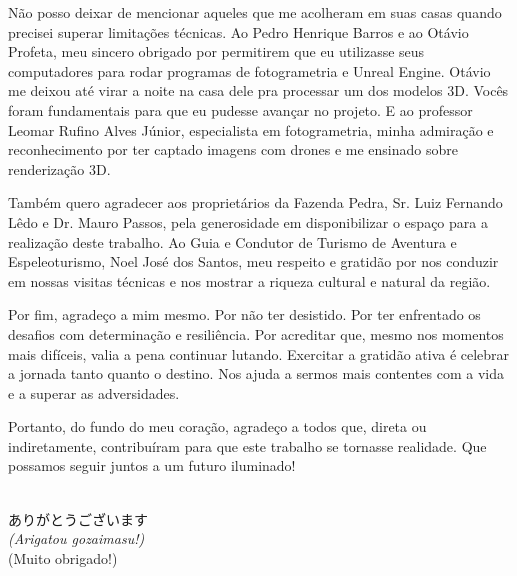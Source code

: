 Não posso deixar de mencionar aqueles que me acolheram em suas casas quando precisei superar limitações técnicas. Ao Pedro Henrique Barros e ao Otávio Profeta, meu sincero obrigado por permitirem que eu utilizasse seus computadores para rodar programas de fotogrametria e Unreal Engine. Otávio me deixou até virar a noite na casa dele pra processar um dos modelos 3D. Vocês foram fundamentais para que eu pudesse avançar no projeto. E ao professor Leomar Rufino Alves Júnior, especialista em fotogrametria, minha admiração e reconhecimento por ter captado imagens com drones e me ensinado sobre renderização 3D.

Também quero agradecer aos proprietários da Fazenda Pedra, Sr. Luiz Fernando Lêdo e Dr. Mauro Passos, pela generosidade em disponibilizar o espaço para a realização deste trabalho.  Ao Guia e Condutor de Turismo de Aventura e Espeleoturismo, Noel José dos Santos, meu respeito e gratidão por nos conduzir em nossas visitas técnicas e nos mostrar a riqueza cultural e natural da região.

Por fim, agradeço a mim mesmo. Por não ter desistido. Por ter enfrentado os desafios com determinação e resiliência. Por acreditar que, mesmo nos momentos mais difíceis, valia a pena continuar lutando. Exercitar a gratidão ativa é celebrar a jornada tanto quanto o destino. Nos ajuda a sermos mais contentes com a vida e a superar as adversidades. 

Portanto, do fundo do meu coração, agradeço a todos que, direta ou indiretamente, contribuíram para que este trabalho se tornasse realidade. Que possamos seguir juntos a um futuro iluminado! 
\\
\\


\begin{flushright}
{\japanesefont ありがとうございます} \\
\textit{(Arigatou gozaimasu!)} \\
(Muito obrigado!)
\end{flushright}
